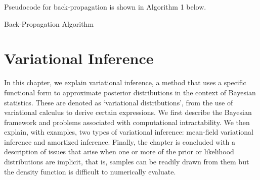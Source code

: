 \documentclass[honours,12pt]{unswthesis}
\numberwithin{equation}{section}
\theoremstyle{definition}
\begin{document}
Pseudocode for back-propagation is shown in Algorithm 1 below.\\
\begin{algorithm}
\caption{Back-Propagation Algorithm}
\BlankLine
{}
\end{algorithm}
\chapter{Variational Inference}
In this chapter, we explain variational inference, a method that uses a specific functional form to approximate posterior distributions in the context of Bayesian statistics. These are denoted as `variational distributions', from the use of variational calculus to derive certain expressions. We first describe the Bayesian framework and problems associated with computational intractability. We then explain, with examples, two types of variational inference: mean-field variational inference and amortized inference. Finally, the chapter is concluded with a description of issues that arise when one or more of the prior or likelihood distributions are implicit, that is, samples can be readily drawn from them but the density function is difficult to numerically evaluate.
\end{document}
